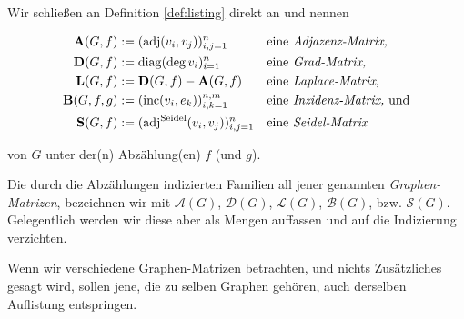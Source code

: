         \begin{definition}

            Wir schließen an Definition \ref{def:listing} direkt an und nennen

            \begin{align*}
                \mathbf A(G, f)    & := (\operatorname{adj}(v_i, v_j))_{i, j = 1}^n               & \text{eine} & ~ \textit{Adjazenz-Matrix,}              \\
                \mathbf D(G, f)    & := \operatorname{diag} (\deg v_i)_{i=1}^n                                  & \text{eine} & ~ \textit{Grad-Matrix,}                  \\
                \mathbf L(G, f)    & := \mathbf D(G, f) - \mathbf A(G, f)                         & \text{eine} & ~ \textit{Laplace-Matrix,}               \\
                \mathbf B(G, f, g) & := (\operatorname{inc}(v_i, e_k))_{i, k = 1}^{n, m}          & \text{eine} & ~ \textit{Inzidenz-Matrix,} ~ \text{und} \\
                \mathbf S(G, f)    & := (\operatorname{adj}^\text{Seidel}(v_i, v_j))_{i, j = 1}^n & \text{eine} & ~ \textit{Seidel-Matrix}
            \end{align*}

            von $G$ unter der(n) Abzählung(en) $f$ (und $g$).

            Die durch die Abzählungen indizierten Familien all jener genannten \textit{Graphen-Matrizen}, bezeichnen wir mit $\mathcal A(G)$, $\mathcal D(G)$, $\mathcal L(G)$, $\mathcal B(G)$, bzw. $\mathcal S(G)$.
            Gelegentlich werden wir diese aber als Mengen auffassen und auf die Indizierung verzichten.

        \end{definition}

        Wenn wir verschiedene Graphen-Matrizen betrachten, und nichts Zusätzliches gesagt wird, sollen jene, die zu selben Graphen gehören, auch derselben Auflistung entspringen.

